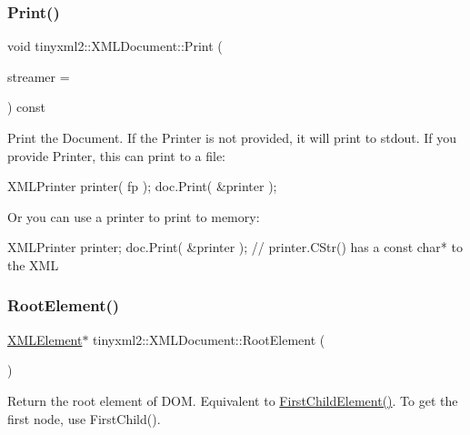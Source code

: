 \subsubsection{\texorpdfstring{Print()}{Print()}}
{\footnotesize\ttfamily void tinyxml2\+::\+X\+M\+L\+Document\+::\+Print (\begin{DoxyParamCaption}\item[{\mbox{\hyperlink{classtinyxml2_1_1_x_m_l_printer}{X\+M\+L\+Printer}} $\ast$}]{streamer = {} }\end{DoxyParamCaption}) const}

Print the Document. If the Printer is not provided, it will print to stdout. If you provide Printer, this can print to a file\+: \begin{DoxyVerb}XMLPrinter printer( fp );
doc.Print( &printer );
\end{DoxyVerb}


Or you can use a printer to print to memory\+: \begin{DoxyVerb}XMLPrinter printer;
doc.Print( &printer );
// printer.CStr() has a const char* to the XML
\end{DoxyVerb}
 \mbox{\label{classtinyxml2_1_1_x_m_l_document_ad2b70320d3c2a071c2f36928edff3e1c}} 
\subsubsection{\texorpdfstring{Root\+Element()}{RootElement()}}
{\footnotesize\ttfamily \mbox{\hyperlink{classtinyxml2_1_1_x_m_l_element}{X\+M\+L\+Element}}$\ast$ tinyxml2\+::\+X\+M\+L\+Document\+::\+Root\+Element (\begin{DoxyParamCaption}{ }\end{DoxyParamCaption})\hspace{0.3cm}{\ttfamily [inline]}}

Return the root element of D\+OM. Equivalent to \mbox{\hyperlink{classtinyxml2_1_1_x_m_l_node_a1bec132dcf085284e0a10755f2cf0d57}{First\+Child\+Element()}}. To get the first node, use First\+Child(). \mbox{\label{classtinyxml2_1_1_x_m_l_document_a73ac416b4a2aa0952e841220eb3da18f}} 
